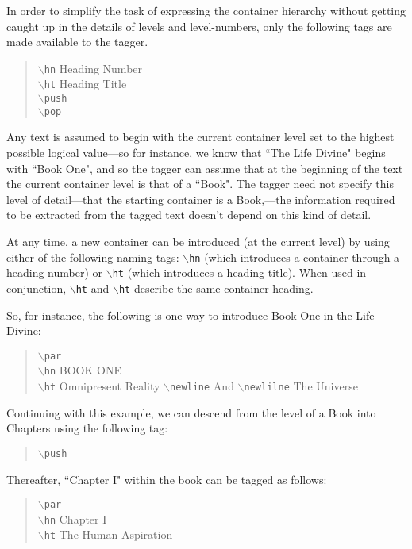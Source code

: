 \documentclass[11pt]{article}
\newcommand{\cmd}[1]{{\tt $\backslash$#1}}
\begin{document}
In order to simplify the task of expressing the container hierarchy
without getting caught up in the details of levels and level-numbers,
only the following tags are made available to the tagger.

\begin{quote}
  \cmd{hn} Heading Number\\
  \cmd{ht} Heading Title\\
  \cmd{push}\\
  \cmd{pop}\\
\end{quote}

Any text is assumed to begin with the current container level set to
the highest possible logical value---so for instance, we know that
``The Life Divine" begins with ``Book One", and so the tagger can
assume that at the beginning of the text the current container level
is that of a ``Book". The tagger need not specify this level of
detail---that the starting container is a Book,---the information
required to be extracted from the tagged text doesn't depend on this
kind of detail.

At any time, a new container can be introduced (at the current level)
by using either of the following naming tags: \cmd{hn} (which
introduces a container through a heading-number) or \cmd{ht} (which
introduces a heading-title). When used in conjunction, \cmd{ht} and
\cmd{ht} describe the same container heading.

So, for instance, the following is one way to introduce Book One in
the Life Divine:

\begin{quote}
  \cmd{par}\\
  \cmd{hn} BOOK ONE\\
  \cmd{ht} Omnipresent Reality \cmd{newline} And \cmd{newlilne} The Universe
\end{quote}

\noindent Continuing with this example, we can descend from the level of a Book
into Chapters using the following tag:

\begin{quote}
  \cmd{push}
\end{quote}

\noindent Thereafter, ``Chapter I" within the book can be tagged as follows:

\begin{quote}
  \cmd{par}\\
  \cmd{hn} Chapter I\\
  \cmd{ht} The Human Aspiration
\end{quote}
\end{document}
